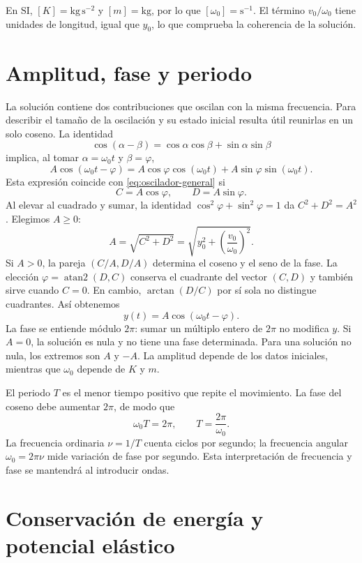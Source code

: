 En SI, $[K]=\mathrm{kg\,s^{-2}}$ y $[m]=\mathrm{kg}$, por lo que
$[\omega_0]=\mathrm{s^{-1}}$. El término $v_0/\omega_0$ tiene unidades
de longitud, igual que $y_0$, lo que comprueba la coherencia de la solución.

\section{Amplitud, fase y periodo}

La solución contiene dos contribuciones que oscilan con la misma frecuencia.
Para describir el tamaño de la oscilación y su estado inicial resulta útil
reunirlas en un solo coseno. La identidad
\[
\cos(\alpha-\beta)=\cos\alpha\cos\beta+\sin\alpha\sin\beta
\]
implica, al tomar $\alpha=\omega_0t$ y $\beta=\varphi$,
\[
A\cos(\omega_0t-\varphi)
=A\cos\varphi\cos(\omega_0t)+A\sin\varphi\sin(\omega_0t).
\]
Esta expresión coincide con \eqref{eq:oscilador-general} si
\[
C=A\cos\varphi,\qquad D=A\sin\varphi.
\]
Al elevar al cuadrado y sumar, la identidad
$\cos^2\varphi+\sin^2\varphi=1$ da $C^2+D^2=A^2$. Elegimos $A\ge0$:
\[
A=\sqrt{C^2+D^2}
=\sqrt{y_0^2+\left(\frac{v_0}{\omega_0}\right)^2}.
\]
Si $A>0$, la pareja $(C/A,D/A)$ determina el coseno y el seno de la fase.
La elección $\varphi=\operatorname{atan2}(D,C)$ conserva el cuadrante del
vector $(C,D)$ y también sirve cuando $C=0$. En cambio,
$\arctan(D/C)$ por sí sola no distingue cuadrantes. Así obtenemos
\begin{equation}
y(t)=A\cos(\omega_0t-\varphi).
\label{eq:oscilador-amplitud-fase}
\end{equation}
La fase se entiende módulo $2\pi$: sumar un múltiplo entero de $2\pi$
no modifica $y$. Si $A=0$, la solución es nula y no tiene una fase determinada.
Para una solución no nula, los extremos son $A$ y $-A$. La amplitud depende
de los datos iniciales, mientras que $\omega_0$ depende de $K$ y $m$.

El periodo $T$ es el menor tiempo positivo que repite el movimiento. La fase
del coseno debe aumentar $2\pi$, de modo que
\[
\omega_0T=2\pi,\qquad T=\frac{2\pi}{\omega_0}.
\]
La frecuencia ordinaria $\nu=1/T$ cuenta ciclos por segundo; la frecuencia
angular $\omega_0=2\pi\nu$ mide variación de fase por segundo. Esta
interpretación de frecuencia y fase se mantendrá al introducir ondas.

\section{Conservación de energía y potencial elástico}

